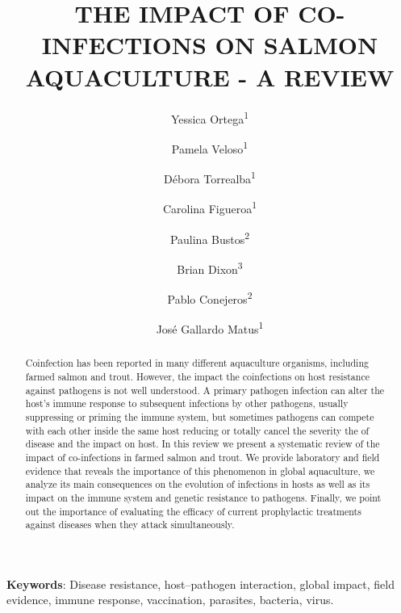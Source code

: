 \documentclass[]{elsarticle} %
\begin{document}
\begin{frontmatter}

  \title{THE IMPACT OF CO-INFECTIONS ON SALMON AQUACULTURE - A REVIEW}
    \author[]{Yessica Ortega\textsuperscript{1}}
  
    \author[]{Pamela Veloso\textsuperscript{1}}
  
    \author[]{Débora Torrealba\textsuperscript{1}}
  
    \author[]{Carolina Figueroa\textsuperscript{1}}
  
    \author[]{Paulina Bustos\textsuperscript{2}}
  
    \author[]{Brian Dixon\textsuperscript{3}}
  
    \author[]{Pablo Conejeros\textsuperscript{2}}
  
    \author[]{José Gallardo Matus\textsuperscript{1}}
      \address[1]{Escuela de Ciencias del Mar, Pontificia Universidad Católica de Valparaíso, Valparaíso, Chile}
    \address[2]{Facultad de Ciencias, Universidad de Valparaíso, Valparaíso, Chile}
    \address[3]{Faculty of Sciences, University of Waterloo, Waterloo, Canada}
    
  \begin{abstract}
  Coinfection has been reported in many different aquaculture organisms, including farmed salmon and trout. However, the impact the coinfections on host resistance against pathogens is not well understood. A primary pathogen infection can alter the host's immune response to subsequent infections by other pathogens, usually suppressing or priming the immune system, but sometimes pathogens can compete with each other inside the same host reducing or totally cancel the severity the of disease and the impact on host. In this review we present a systematic review of the impact of co-infections in farmed salmon and trout. We provide laboratory and field evidence that reveals the importance of this phenomenon in global aquaculture, we analyze its main consequences on the evolution of infections in hosts as well as its impact on the immune system and genetic resistance to pathogens. Finally, we point out the importance of evaluating the efficacy of current prophylactic treatments against diseases when they attack simultaneously.
  \end{abstract}
  
 \end{frontmatter}

\textbf{Keywords}: Disease resistance, host--pathogen interaction, global impact, field evidence, immune response, vaccination, parasites, bacteria, virus.
\end{document}
